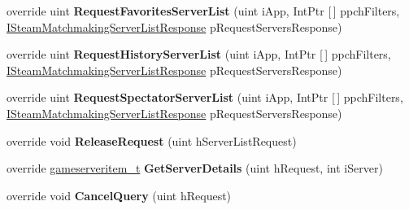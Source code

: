 \begin{DoxyCompactItemize}
override uint {\bfseries Request\+Favorites\+Server\+List} (uint i\+App, Int\+Ptr \mbox{[}$\,$\mbox{]} ppch\+Filters, \hyperlink{class_valve_1_1_steamworks_1_1_i_steam_matchmaking_server_list_response}{I\+Steam\+Matchmaking\+Server\+List\+Response} p\+Request\+Servers\+Response)
\item 
\mbox{\label{class_valve_1_1_steamworks_1_1_c_steam_matchmaking_servers_aeaa15966afbc6232d0c0137ea7e08752}} 
override uint {\bfseries Request\+History\+Server\+List} (uint i\+App, Int\+Ptr \mbox{[}$\,$\mbox{]} ppch\+Filters, \hyperlink{class_valve_1_1_steamworks_1_1_i_steam_matchmaking_server_list_response}{I\+Steam\+Matchmaking\+Server\+List\+Response} p\+Request\+Servers\+Response)
\item 
\mbox{\label{class_valve_1_1_steamworks_1_1_c_steam_matchmaking_servers_a081c8e55732f0f447f132a1e4a620b97}} 
override uint {\bfseries Request\+Spectator\+Server\+List} (uint i\+App, Int\+Ptr \mbox{[}$\,$\mbox{]} ppch\+Filters, \hyperlink{class_valve_1_1_steamworks_1_1_i_steam_matchmaking_server_list_response}{I\+Steam\+Matchmaking\+Server\+List\+Response} p\+Request\+Servers\+Response)
\item 
\mbox{\label{class_valve_1_1_steamworks_1_1_c_steam_matchmaking_servers_a8ac772614b22ad6e881745f8eef27f7b}} 
override void {\bfseries Release\+Request} (uint h\+Server\+List\+Request)
\item 
\mbox{\label{class_valve_1_1_steamworks_1_1_c_steam_matchmaking_servers_a3994cb71dc758750855a96c5023dd910}} 
override \hyperlink{struct_valve_1_1_steamworks_1_1gameserveritem__t}{gameserveritem\+\_\+t} {\bfseries Get\+Server\+Details} (uint h\+Request, int i\+Server)
\item 
\mbox{\label{class_valve_1_1_steamworks_1_1_c_steam_matchmaking_servers_a45e3336eab9b80ae01d55425a19328e8}} 
override void {\bfseries Cancel\+Query} (uint h\+Request)
\item 
\mbox{\label{class_valve_1_1_steamworks_1_1_c_steam_matchmaking_servers_adcac27e20944609d41a60abd647bddeb}} 

\end{DoxyCompactItemize}
